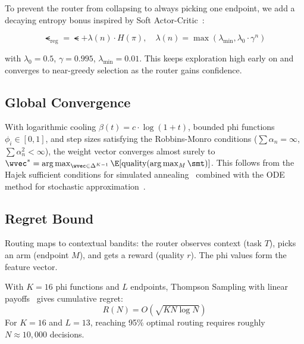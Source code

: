 To prevent the router from collapsing to always picking one endpoint, we add a decaying entropy bonus inspired by Soft Actor-Critic~\citep{haarnoja2018sac}:

\begin{equation}
\label{eq:entropy}
\smt_{\text{reg}} = \smt + \lambda(n) \cdot H(\pi), \quad \lambda(n) = \max\left(\lambda_{\min}, \lambda_0 \cdot \gamma^n\right)
\end{equation}

with $\lambda_0 = 0.5$, $\gamma = 0.995$, $\lambda_{\min} = 0.01$. This keeps exploration high early on and converges to near-greedy selection as the router gains confidence.

\subsection{Global Convergence}

\begin{theorem}
\label{thm:hajek}
With logarithmic cooling $\beta(t) = c \cdot \log(1 + t)$, bounded phi functions $\phi_i \in [0,1]$, and step sizes satisfying the Robbins-Monro conditions ($\sum \alpha_n = \infty$, $\sum \alpha_n^2 < \infty$), the weight vector converges almost surely to $\wvec^* = \arg\max_{\wvec \in \Delta^{K-1}} \E[\text{quality}(\arg\max_M \smt)]$. This follows from the Hajek sufficient conditions for simulated annealing~\citep{hajek1988cooling} combined with the ODE method for stochastic approximation~\citep{kushner2003stochastic}.
\end{theorem}

\subsection{Regret Bound}

Routing maps to contextual bandits: the router observes context (task $T$), picks an arm (endpoint $M$), and gets a reward (quality $r$). The phi values form the feature vector.

\begin{theorem}
\label{thm:regret}
With $K=16$ phi functions and $L$ endpoints, Thompson Sampling with linear payoffs~\citep{agrawal2013thompson} gives cumulative regret:
\begin{equation}
\label{eq:regret}
R(N) = O\left(\sqrt{KN\log N}\right)
\end{equation}
For $K=16$ and $L=13$, reaching 95\% optimal routing requires roughly $N \approx 10{,}000$ decisions.
\end{theorem}

